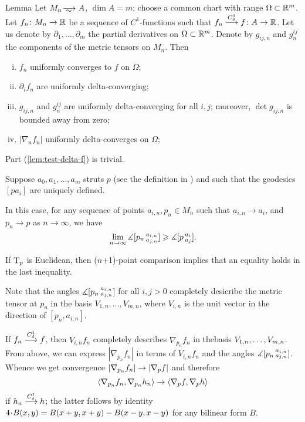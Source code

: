 \begin{thm}{Lemma}\label{lem:test-delta}
Let $M_n\smooths{} A$, $\dim A=m$;
choose a common chart with range $\Omega\subset \mathbb{R}^m$.
Let $f_n\colon M_n\to\mathbb{R}$ be a sequence of $C^1$-functions such that $f_n\zz\smoothto f\:A\to \RR$.
Let us denote by $\partial_1,\dots,\partial_m$ the partial derivatives on $\Omega\subset \mathbb{R}^m$.
Denote by $g_{ij,n}$ and $g^{ij}_n$ the components of the metric tensors on $M_n$.
Then 
\begin{enumerate}[(i)]
\item\label{lem:test-delta-f} $f_n$ uniformly converges to $f$ on $\Omega$;
\item\label{lem:test-delta-partial} $\partial_if_n$ are uniformly delta-converging;
\item\label{lem:test-delta-g}  $g_{ij,n}$ and $g^{ij}_n$ are uniformly delta-converging for all $i,j$;
moreover, $\det g_{ij,n}$ is bounded away from zero;
\item\label{lem:test-delta|nabla|} $|\nabla_n f_n|$ uniformly delta-converges on $\Omega$; %
\end{enumerate}

\end{thm}

Part (\ref{lem:test-delta-f}) is trivial.

Suppose $a_0, a_1,\dots,a_m$ struts $p$ (see the definition in \cite{AKP}) and such that the geodesics $[pa_i]$ are uniquely defined.

In this case, for any sequence of points $a_{i,n}, p_n\in M_n$ such that $a_{i,n}\to a_i$, and $p_n\to p$ as $n\to\infty$, we have
\[\lim_{n\to\infty}\measuredangle [p_n\,{}^{a_{i,n}}_{a_{j,n}}]\geqslant \measuredangle [p\,{}^{a_i}_{a_j}].\]

If $\mathrm{T}_p$ is Euclidean, then ($n$+1)-point comparison implies that an equality holds in the last inequality.

Note that the angles $\measuredangle [p_n\,{}^{a_{i,n}}_{a_{j,n}}]$ for all $i,j>0$ completely desicribe the metric tensor at $p_n$ in the basis $V_{1,n},\dots,V_{m,n}$, where $V_{i,n}$ is the unit vector in the direction of $[p_n,a_{i,n}]$.

If $f_n\zz\smoothto f$, then $V_{i,n}f_n$ completely describes $\nabla_{p_n}f_n$ in thebasis $V_{1,n},\zz\dots,V_{m,n}$.
From above, we can express $|\nabla_{p_n}f_n|$ in terms of $V_{i,n}f_n$ and the angles $\measuredangle [p_n\,{}^{a_{i,n}}_{a_{j,n}}]$.
Whence we get convergence $|\nabla_{p_n} f_n|\zz\to |\nabla_{p} f|$ and therefore 
\[\langle \nabla_{p_n} f_n,\nabla_{p_n} h_n\rangle\zz\to \langle \nabla_p f,\nabla_p h\rangle\] if $h_n\stackrel{C^1_\delta}{\longrightarrow} h$; the latter follows by identity $4\cdot B(x,y)\zz=B(x\zz+y,x\zz+y)\zz-B(x\zz-y,x\zz-y)$ for any bilinear form $B$.


